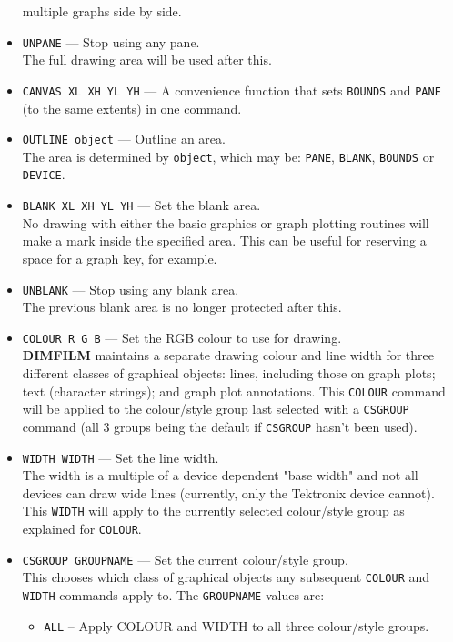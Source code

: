 \documentclass[a4paper,twoside,11pt]{article}
\newcommand{\textttc}[1]{\texttt{\textcolor{OurRed}{#1}}}
\begin{document}
\begin{itemize}
   multiple graphs side by side.
\item \textttc{UNPANE} --- Stop using any pane.\\ 
  The full drawing area will be used after this.
\item \textttc{CANVAS XL XH YL YH} --- A convenience function that sets \texttt{BOUNDS}
  and \texttt{PANE} (to the same extents) in one command.
 \item \textttc{OUTLINE object} --- Outline an area.\\
   The area is determined by \texttt{object}, which may be: \texttt{PANE}, \texttt{BLANK},
   \texttt{BOUNDS} or \texttt{DEVICE}.
\item \textttc{BLANK XL XH YL YH} --- Set the blank area.\\
   No drawing with either the basic graphics or graph plotting routines will
   make a mark inside the specified area. This can be useful for reserving a
   space for a graph key, for example.
\item \textttc{UNBLANK} --- Stop using any blank area.\\
   The previous blank area is no longer protected after this.
\item \textttc{COLOUR R G B} --- Set the RGB colour to use for drawing.\\
   \textbf{DIMFILM} maintains a separate drawing colour and line width for three
   different classes of graphical objects: lines, including those on graph plots;
   text (character strings); and graph plot annotations. This \texttt{COLOUR}
   command will be applied to the colour/style group last selected with
   a \texttt{CSGROUP} command (all 3 groups being the default if \texttt{CSGROUP} hasn't
   been used).
\item \textttc{WIDTH WIDTH} --- Set the line width.\\
   The width is a multiple of a device dependent "base width" and not all devices
   can draw wide lines (currently, only the Tektronix device cannot). This \texttt{WIDTH} will
   apply to the currently selected colour/style group as explained for \texttt{COLOUR}.
\item \textttc{CSGROUP GROUPNAME} --- Set the current colour/style group.\\
	This chooses which class of graphical objects any subsequent \texttt{COLOUR} and \texttt{WIDTH}
	commands apply to. The \texttt{GROUPNAME} values are: 
	\begin{itemize}
	\item \textttc{ALL} -- Apply COLOUR and WIDTH to all three colour/style groups.

\end{itemize}
\end{itemize}
\end{document}
